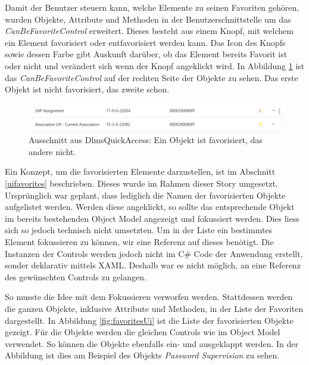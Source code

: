 Damit der Benutzer steuern kann, welche Elemente zu seinen Favoriten gehören, wurden Objekte, Attribute und Methoden in der Benutzerschnittstelle um das \textit{CanBeFavoriteControl} erweitert.
Dieses besteht aus einem Knopf, mit welchem ein Element favorisiert oder entfavorisiert werden kann.
Das Icon des Knopfs sowie dessen Farbe gibt Auskunft darüber, ob das Element bereits Favorit ist oder nicht und verändert sich wenn der Knopf angeklickt wird.
In Abbildung \ref{fig:objectModelWithFavorites} ist das \textit{CanBeFavoriteControl} auf der rechten Seite der Objekte zu sehen.
Das erste Objekt ist nicht favorisiert, das zweite schon.

\begin{figure}
   \centering
   \includegraphics[width=1.0\textwidth]{gfx/objectModelWithFavorites.png}
   \caption{
      Ausschnitt aus DlmsQuickAccess: Ein Objekt ist favorisiert, das andere nicht.
      }
   \label{fig:objectModelWithFavorites}
\end{figure}

Ein Konzept, um die favorisierten Elemente darzustellen, ist im Abschnitt \ref{uifavorites} beschrieben.
Dieses wurde im Rahmen dieser Story umgesetzt.
Ursprünglich war geplant, dass lediglich die Namen der favorisierten Objekte aufgelistet werden.
Werden diese angeklickt, so sollte das entsprechende Objekt im bereits bestehenden Object Model angezeigt und fokussiert werden.
Dies liess sich so jedoch technisch nicht umsetzten.
Um in der Liste ein bestimmtes Element fokussieren zu können, wir eine Referenz auf dieses benötigt.
Die Instanzen der Controls werden jedoch nicht im C\# Code der Anwendung erstellt, sonder deklarativ mittels XAML.
Deshalb war es nicht möglich, an eine Referenz des gewünschten Controls zu gelangen.

So musste die Idee mit dem Fokussieren verworfen werden.
Stattdessen werden die ganzen Objekte, inklusive Attribute und Methoden, in der Liste der Favoriten dargestellt.
In Abbildung \ref{fig:favoritesUi} ist die Liste der favorisierten Objekte gezeigt.
Für die Objekte werden die gleichen Controls wie im Object Model verwendet.
So können die Objekte ebenfalls ein- und ausgeklappt werden.
In der Abbildung ist dies am Beispiel des Objekts \textit{Password Supervision} zu sehen.

